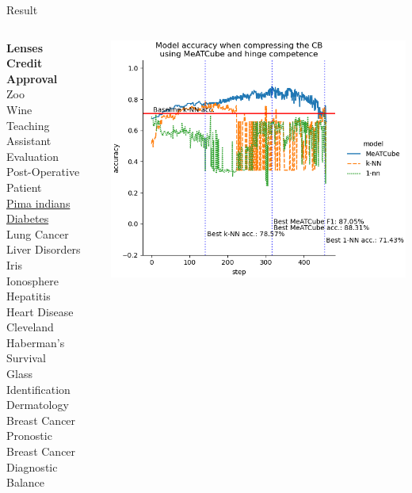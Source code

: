\documentclass[]{beamer}
\begin{document}
\begin{frame}{Result}
    \begin{columns}
        \begin{column}{.35\textwidth}
            {\smaller\smaller
            \textbf{Lenses} \\
            \textbf{Credit Approval} \\
            Zoo \\
            Wine \\
            Teaching Assistant Evaluation \\
            Post-Operative Patient \\
            \underline{Pima indians Diabetes} \\
            Lung Cancer \\
            Liver Disorders \\
            Iris \\
            Ionosphere \\
            Hepatitis \\
            Heart Disease Cleveland \\
            Haberman's Survival \\
            Glass Identification \\
            Dermatology \\
            Breast Cancer Pronostic \\
            Breast Cancer Diagnostic \\
            Balance\\
            ~}
        \end{column}
        \begin{column}{.65\textwidth}
            \includegraphics[width=.8\textwidth]{../results/figs/kaggle+pima+indian+diabetes.png}

\end{column}
\end{columns}
\end{frame}
\end{document}
